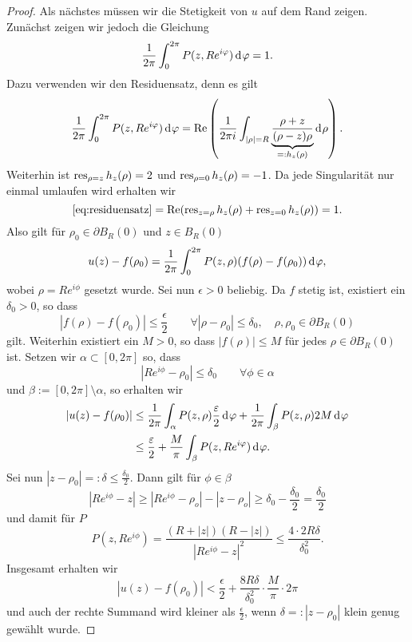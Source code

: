 \begin{proof}
  Als nächstes müssen wir die Stetigkeit von $u$ auf dem Rand
  zeigen. Zunächst zeigen wir jedoch die Gleichung
  \[
  \frac{1}{2\pi} \int_0^{2\pi} P(z, Re^{i\phi}) \d[\phi] = 1.
  \]
  Dazu verwenden wir den Residuensatz, denn es gilt
  \begin{align}
  \frac{1}{2\pi} \int_0^{2\pi} P(z, Re^{i\phi}) \d[\phi]
  = \Re \left ( \frac{1}{2\pi i} \int_{|\rho| = R} \underbrace{
      \frac{\rho + z}{(\rho - z)\rho}}_{=:h_z(\rho)} \d[\rho] \right
  ). \label{eq:residuensatz}
  \end{align}
  Weiterhin ist $\operatorname{res}_{\rho = z} h_z(\rho) = 2$ und $\operatorname{res}_{\rho=0}
  h_z(\rho) = -1$. Da jede Singularität nur einmal umlaufen wird
  erhalten wir
  \[
  \eqref{eq:residuensatz} = \operatorname{Re}(\operatorname{res}_{z = \rho}h_z(\rho) + \operatorname{res}_{z =
    0} h_z(\rho)) = 1.
  \]
  Also gilt für $\rho_0 \in \partial B_R(0)$ und $z \in B_R(0)$
  \[
  u(z) - f(\rho_0) = \frac{1}{2\pi} \int_0^{2\pi} P(z, \rho) (f (\rho)
  - f(\rho_0) )\d[\phi],
  \]
  wobei $\rho = Re^{i\phi}$ gesetzt wurde. Sei nun $\epsilon > 0$ beliebig. Da $f$
  stetig ist, existiert ein $\delta_0 > 0$, so dass
  \[
  |f(\rho) - f(\rho_0)| \leq \frac{\epsilon}{2} \qquad \forall |\rho -
  \rho_0| \leq \delta_0, \quad \rho, \rho_0 \in \partial B_R(0)
  \]
  gilt. Weiterhin existiert ein $M > 0$, so dass $|f(\rho)| \leq M$ für
  jedes $\rho \in \partial B_R(0)$ ist. Setzen wir $\alpha \subset [0, 2\pi]$
  so, dass
  \[
  |R e^{i\phi} - \rho_0| \leq \delta_0 \qquad \forall \phi \in \alpha
  \]
  und $\beta := [0, 2\pi]\setminus \alpha$, so erhalten wir
  \begin{align*}
    |u(z) - f(\rho_0)| & \leq \frac{1}{2\pi} \int_\alpha
    P(z, \rho) \frac{\epsilon}{2} \d[\phi] +
    \frac{1}{2\pi} \int_\beta P(z, \rho) 2 M \d[\phi] \\
    & \leq \frac{\epsilon}{2} + \frac{M}{\pi} \int_\beta P(z,
    Re^{i\phi}) \d[\phi].
  \end{align*}
  Sei nun $|z - \rho_0| =: \delta \leq \frac{\delta_0}{2}$. Dann gilt
  für $\phi \in \beta$
  \[
  |Re^{i\phi} - z| \geq |Re^{i\phi} - \rho_o| - |z - \rho_o| \geq
  \delta_0 - \frac{\delta_0}{2} = \frac{\delta_0}{2}
  \]
  und damit für $P$
  \[
  P(z, Re^{i\phi}) = \frac{(R+ |z|)(R - |z|)}{|Re^{i\phi} - z|^2} \leq
  \frac{4 \cdot 2 R \delta}{\delta_0^2}.
  \]
  Insgesamt erhalten wir
  \[
  |u(z) - f(\rho_0)| < \frac{\epsilon}{2} + \frac{8 R
    \delta}{\delta_0^2} \cdot \frac{M}{\pi} \cdot 2\pi
  \]
  und auch der rechte Summand wird kleiner als
  $\frac{\epsilon}{2}$, wenn $\delta =: |z - \rho_0|$ klein genug
  gewählt wurde.
\end{proof}

